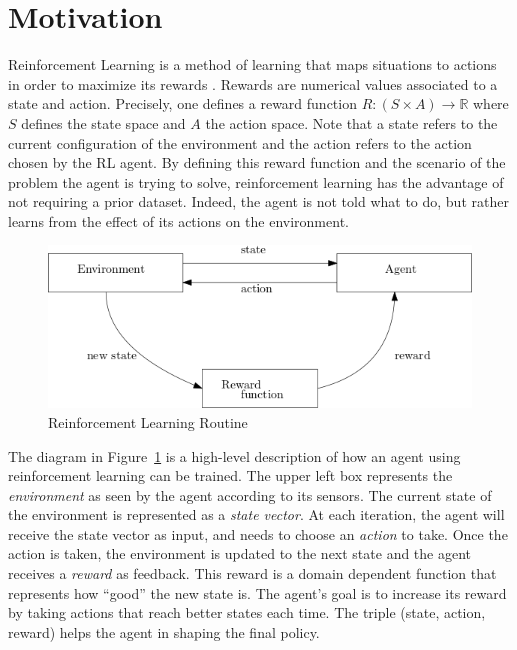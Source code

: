 \section{Motivation} 

Reinforcement Learning is a method of learning that maps situations to
actions in order to maximize its rewards
\cite{sutton2018reinforcement}. Rewards are numerical values associated to a state and action. Precisely, one defines a reward function 
$R : (S \times A) \rightarrow \mathbb{R}$ where $S$ defines the state space and $A$ the action space. Note that a state refers to the current configuration
of the environment and the action refers to the action chosen by the RL agent. By defining this reward function and the scenario of the problem the agent is trying to solve, 
reinforcement learning has the advantage of not requiring a prior dataset. Indeed, the agent is not told what to do, but rather 
learns from the effect of its actions on the environment. 

\begin{figure}[H]
  \centering
  \includegraphics[scale=0.4]{figures/rlroutine.png}
  \caption{Reinforcement Learning Routine}
  \label{fig:rl}
\end{figure}


The diagram in Figure~\ref{fig:rl} is a high-level description of how
an agent using reinforcement learning can be trained.  
%
The upper left box represents the \emph{environment} as seen by the agent
according to its sensors.
%
The current state of the environment is represented as a \emph{state
vector}.
%
At each iteration, the agent will receive the state vector as input,
and needs to choose an \emph{action} to take.
%
Once the action is taken, the environment is updated to the next state
and the agent receives a \emph{reward} as feedback.
%
This reward is a domain dependent function that represents how
``good'' the new state is.
%
The agent's goal is to increase its reward by taking actions that
reach better states each time.
%
The triple (state, action, reward) helps the agent in shaping the
final policy.

